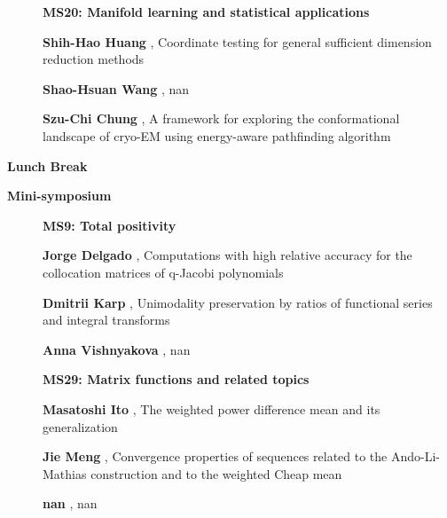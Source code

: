 \documentclass[ILAS2025-program.tex]{subfiles}
\begin{document}
\begin{description}
\begin{description}
        \end{description}
    \begin{description}
    \item[] {\color{mstitle}\textbf{MS20: Manifold learning and statistical applications}} 
    \item[] \textbf{Shih-Hao Huang} , Coordinate testing for general sufficient dimension reduction methods
        \item[] \textbf{Shao-Hsuan Wang} , nan
        \item[] \textbf{Szu-Chi Chung} , A framework for exploring the conformational landscape of cryo-EM using energy-aware pathfinding algorithm
        \end{description}
    \item[\info{12:30\textrm{--}14:00}] \textbf{Lunch Break} \info{}
    \item[\info{14:00\textrm{--}15:30}] \textbf{Mini-symposium} 
    \begin{description}
    \item[] {\color{mstitle}\textbf{MS9: Total positivity}} 
    \item[] \textbf{Jorge Delgado} , Computations with high relative accuracy for the collocation matrices of q-Jacobi polynomials
        \item[] \textbf{Dmitrii Karp} , Unimodality preservation by ratios of functional series and integral transforms
        \item[] \textbf{Anna Vishnyakova} , nan
        \end{description}
    \begin{description}
    \item[] {\color{mstitle}\textbf{MS29: Matrix functions and related topics}} 
    \item[] \textbf{Masatoshi Ito} , The weighted power difference mean and its generalization
        \item[] \textbf{Jie Meng} , Convergence properties of sequences related to the Ando-Li-Mathias construction and to the weighted Cheap mean
        \item[] \textbf{nan} , nan
        \end{description}
    \begin{description}

\end{description}
\end{description}
\end{document}
